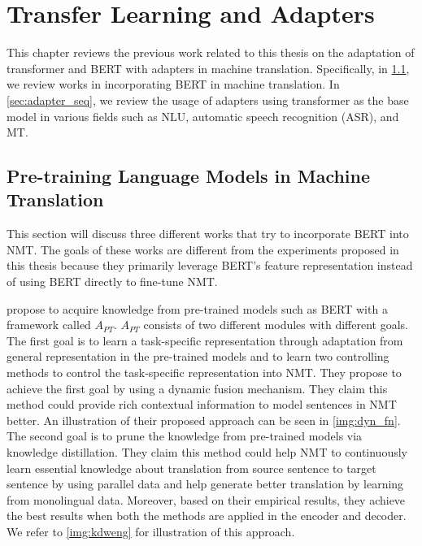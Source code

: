 \chapter{Transfer Learning and Adapters}

This chapter reviews the previous work related to this thesis on the adaptation of transformer and BERT with adapters in machine translation. Specifically, in \cref{sec:prelm_mt}, we review works in incorporating BERT in machine translation. In \cref{sec:adapter_seq}, we review the usage of adapters using transformer as the base model in various fields such as NLU, automatic speech recognition (ASR), and MT.

\section{Pre-training Language Models in Machine Translation}
\label{sec:prelm_mt}

This section will discuss three different works that try to incorporate BERT into NMT. The goals of these works are different from the experiments proposed in this thesis because they primarily leverage BERT's feature representation instead of using BERT directly to fine-tune NMT.

 propose to acquire knowledge from pre-trained models such as BERT with a framework called $A_{PT}$. $A_{PT}$ consists of two different modules with different goals. The first goal is to learn a task-specific representation through adaptation from general representation in the pre-trained models and to learn two controlling methods to control the task-specific representation into NMT. They propose to achieve the first goal by using a dynamic fusion mechanism. They claim this method could provide rich contextual information to model sentences in NMT better. An illustration of their proposed approach can be seen in \cref{img:dyn_fn}. The second goal is to prune the knowledge from pre-trained models via knowledge distillation. They claim this method could help NMT to continuously learn essential knowledge about translation from source sentence to target sentence by using parallel data and help generate better translation by learning from monolingual data. Moreover, based on their empirical results, they achieve the best results when both the methods are applied in the encoder and decoder. We refer to \cref{img:kdweng} for illustration of this approach.

